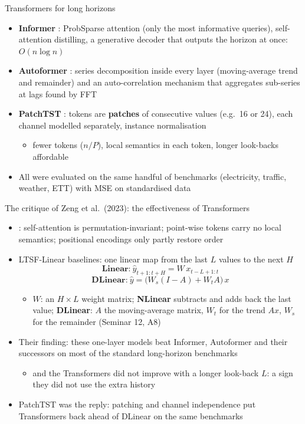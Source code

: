\begin{frame}{Transformers for long horizons}
\itemsize{\small}
\begin{itemize}
    \item \textbf{Informer} : ProbSparse attention (only the most informative queries), self-attention distilling, a generative decoder that outputs the horizon at once: $O(n\log n)$
    \item \textbf{Autoformer} : series decomposition inside every layer (moving-average trend and remainder) and an auto-correlation mechanism that aggregates sub-series at lags found by FFT
    \item \textbf{PatchTST} : tokens are \textbf{patches} of consecutive values (e.g.\ 16 or 24), each channel modelled separately, instance normalisation
    \begin{itemize}
        \item fewer tokens ($n/P$), local semantics in each token, longer look-backs affordable
    \end{itemize}
    \item All were evaluated on the same handful of benchmarks (electricity, traffic, weather, ETT) with MSE on standardised data
\end{itemize}
\end{frame}

\begin{frame}{The critique of Zeng et al.\ (2023): the effectiveness of Transformers}
\itemsize{\small}
\begin{itemize}
    \item {}: self-attention is permutation-invariant; point-wise tokens carry no local semantics; positional encodings only partly restore order
    \item LTSF-Linear baselines: one linear map from the last $L$ values to the next $H$
    \[ \textbf{Linear:}\ \hat y_{t+1:t+H} = W\,x_{t-L+1:t} \]
    \[ \textbf{DLinear:}\ \hat y = \big(W_s(I - A) + W_tA\big)\,x \]
    \begin{itemize}
        \item $W$: an $H \times L$ weight matrix; \textbf{NLinear} subtracts and adds back the last value; \textbf{DLinear}: $A$ the moving-average matrix, $W_t$ for the trend $Ax$, $W_s$ for the remainder (Seminar 12, A8)
    \end{itemize}
    \item Their finding: these one-layer models beat Informer, Autoformer and their successors on most of the standard long-horizon benchmarks
    \begin{itemize}
        \item and the Transformers did not improve with a longer look-back $L$: a sign they did not use the extra history
    \end{itemize}
    \item PatchTST was the reply: patching and channel independence put Transformers back ahead of DLinear on the same benchmarks
\end{itemize}
\end{frame}


